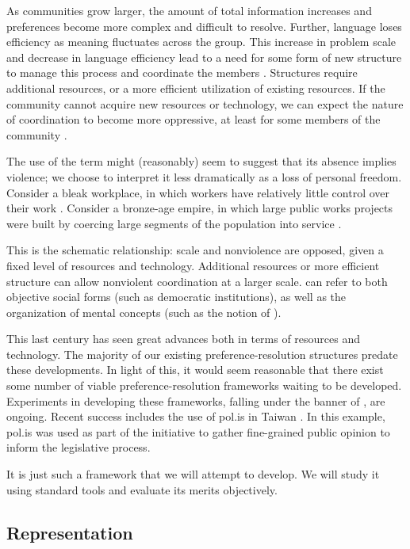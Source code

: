 As communities grow larger, the amount of total information increases and preferences become more complex and difficult to resolve.
Further, language loses efficiency as meaning fluctuates across the group.
This increase in problem scale and decrease in language efficiency lead to a need for some form of new structure to manage this process and coordinate the members \cite{hobbes}.
Structures require additional resources, or a more efficient utilization of existing resources.
If the community cannot acquire new resources or technology, we can expect the nature of coordination to become more oppressive, at least for some members of the community \cite{eisenberg}.

The use of the term  might (reasonably) seem to suggest that its absence implies violence; we choose to interpret it less dramatically as a loss of personal freedom.
Consider a bleak workplace, in which workers have relatively little control over their work \cite{lin}.
Consider a bronze-age empire, in which large public works projects were built by coercing large segments of the population into service \cite{heilbroner}.

This is the schematic relationship: scale and nonviolence are opposed, given a fixed level of resources and technology.
Additional resources or more efficient structure can allow nonviolent coordination at a larger scale.
 can refer to both objective social forms (such as democratic institutions), as well as the organization of mental concepts (such as the notion of ).

This last century has seen great advances both in terms of resources and technology.
The majority of our existing preference-resolution structures predate these developments.
In light of this, it would seem reasonable that there exist some number of viable preference-resolution frameworks waiting to be developed.
Experiments in developing these frameworks, falling under the banner of , are ongoing.
Recent success includes the use of pol.is in Taiwan \cite{barry}.
In this example, pol.is was used as part of the  initiative to gather fine-grained public opinion to inform the legislative process.

It is just such a framework that we will attempt to develop.
We will study it using standard tools and evaluate its merits objectively.


\subsection{Representation}

